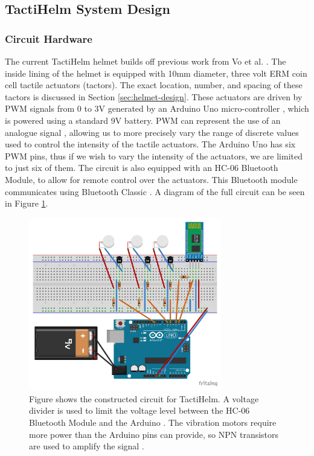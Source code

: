 \documentclass{interim}
\begin{document}
\subsection{TactiHelm System Design}\label{sec:system-design}
\subsubsection{Circuit Hardware}\label{sec:circuit-design}
The current TactiHelm helmet builds off previous work from Vo et al. \cite{10.1145/3411763.3451580}. The inside lining of the helmet is equipped with 10mm diameter, three volt ERM coin cell tactile actuators (tactors). The exact location, number, and spacing of these tactors is discussed in Section \ref{sec:helmet-design}. These actuators are driven by PWM signals from 0 to 3V generated by an Arduino Uno micro-controller \cite{arduinouno}, which is powered using a standard 9V battery. PWM can represent the use of an analogue signal \cite{kart2001pulse}, allowing us to more precisely vary the range of discrete values used to control the intensity of the tactile actuators. The Arduino Uno has six PWM pins, thus if we wish to vary the intensity of the actuators, we are limited to just six of them. The circuit is also equipped with an HC-06 Bluetooth Module, to allow for remote control over the actuators. This Bluetooth module communicates using Bluetooth Classic \cite{hc06}. A diagram of the full circuit can be seen in Figure \ref{fig:circuit}.

\begin{figure}[ht]
    \centering
    \includegraphics[width=0.75\textwidth]{images/circuit-design_bb.pdf}
    \caption{Figure shows the constructed circuit for TactiHelm. A voltage divider is used to limit the voltage level between the HC-06 Bluetooth Module and the Arduino \cite{bluetoothmodule}. The vibration motors require more power than the Arduino pins can provide, so NPN transistors are used to amplify the signal \cite{vibrationmotor}.}
    \label{fig:circuit}
\end{figure}
\end{document}
